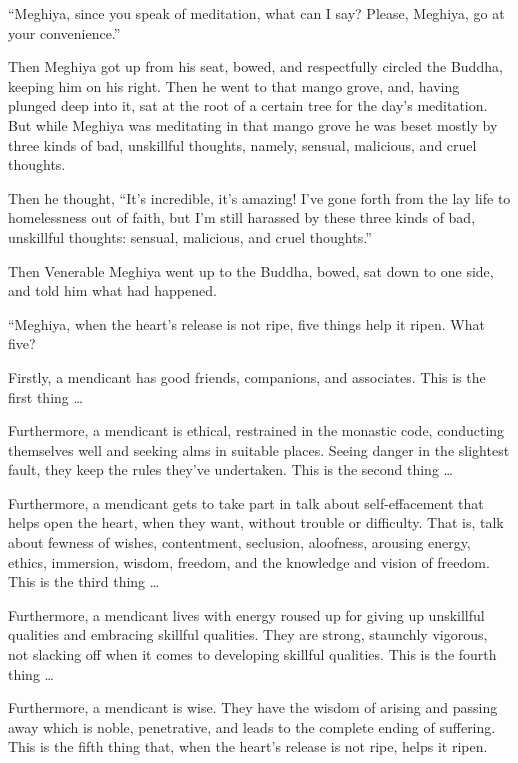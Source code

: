 \documentclass[12pt,openany]{book}%
\begin{document}
“Meghiya, since you speak of meditation, what can I say? Please, Meghiya, go at your convenience.” 

Then Meghiya got up from his seat, bowed, and respectfully circled the Buddha, keeping him on his right. Then he went to that mango grove, and, having plunged deep into it, sat at the root of a certain tree for the day’s meditation. But while Meghiya was meditating in that mango grove he was beset mostly by three kinds of bad, unskillful thoughts, namely, sensual, malicious, and cruel thoughts. 

Then he thought, “It’s incredible, it’s amazing! I’ve gone forth from the lay life to homelessness out of faith, but I’m still harassed by these three kinds of bad, unskillful thoughts: sensual, malicious, and cruel thoughts.” 

Then Venerable Meghiya went up to the Buddha, bowed, sat down to one side, and told him what had happened. 

“Meghiya, when the heart’s release is not ripe, five things help it ripen. What five? 

Firstly, a mendicant has good friends, companions, and associates. This is the first thing … 

Furthermore, a mendicant is ethical, restrained in the monastic code, conducting themselves well and seeking alms in suitable places. Seeing danger in the slightest fault, they keep the rules they’ve undertaken. This is the second thing … 

Furthermore, a mendicant gets to take part in talk about self-effacement that helps open the heart, when they want, without trouble or difficulty. That is, talk about fewness of wishes, contentment, seclusion, aloofness, arousing energy, ethics, immersion, wisdom, freedom, and the knowledge and vision of freedom. This is the third thing … 

Furthermore, a mendicant lives with energy roused up for giving up unskillful qualities and embracing skillful qualities. They are strong, staunchly vigorous, not slacking off when it comes to developing skillful qualities. This is the fourth thing … 

Furthermore, a mendicant is wise. They have the wisdom of arising and passing away which is noble, penetrative, and leads to the complete ending of suffering. This is the fifth thing that, when the heart’s release is not ripe, helps it ripen. 
\end{document}
